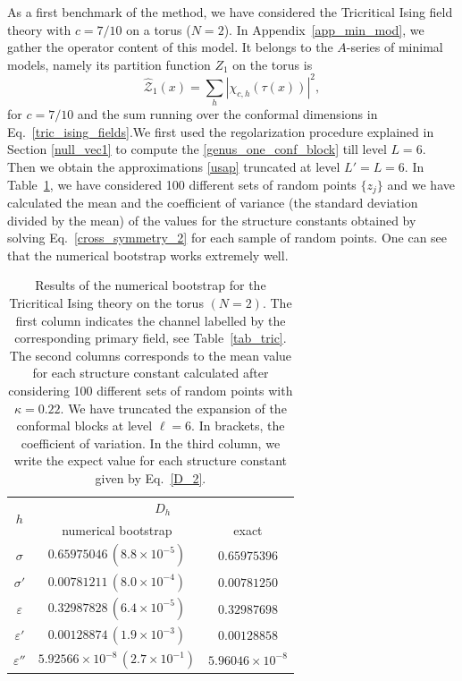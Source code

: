 \documentclass[a4paper,11pt]{article}
\begin{document}
As a first benchmark of the method, we have considered the Tricritical 
Ising field theory with $c=7/10$ on a torus ($N=2$). 
In Appendix~\ref{app_min_mod}, we gather the operator content
of this model. It belongs to the $A$-series of minimal models, namely  its partition function $Z_1$ on the torus is 
\begin{equation}
\hat{\mathcal{Z}}_1(x)=\sum_{h}|\chi_{c,h}(\tau(x))|^2,
\end{equation}
for $c=7/10$ and the sum running over the conformal dimensions in Eq.~\eqref{tric_ising_fields}.We first used the regolarization procedure explained in Section \ref{null_vec1} to compute the \eqref{genus_one_conf_block} till level $L=6$. Then we obtain the approximations \eqref{usap} 
truncated at level $L'=L=6$.
In Table~\ref{tab_tric_results}, we have considered 100 different sets of
random points $\{z_j\}$ and we have calculated the mean and 
the coefficient of  variance (the standard deviation divided by the mean) 
of the values for the structure constants obtained by solving Eq.~\eqref{cross_symmetry_2} 
for each sample of random points. One can see that the numerical  bootstrap works extremely well.

\begin{table}[tbp]
\centering
\begin{tabular}{|c|c|c|}
\hline 
  \multirow{2}{*}{$h$} &  \multicolumn{2}{c|}{$D_{h}$} \\
  \cline{2-3}
                       & numerical bootstrap  & exact  \\
 \hline
 $\sigma$        &  $0.65975046\,(8.8\times 10^{-5})$ & $0.65975396$\\
 $\sigma'$       &  $0.00781211\,(8.0\times 10^{-4})$ & $0.00781250$\\
 $\varepsilon$   &  $0.32987828\,(6.4\times 10^{-5})$ & $0.32987698$\\
 $\varepsilon'$  &  $0.00128874\,(1.9\times 10^{-3})$ & $0.00128858$\\
 $\varepsilon''$ &  $5.92566\times10^{-8}\,(2.7\times 10^{-1})$ & $5.96046\times 10^{-8}$ \\
 \hline
\end{tabular}
\caption{\label{tab_tric_results} Results of the numerical bootstrap for the Tricritical 
Ising theory on the torus $(N=2)$. The first column indicates the channel labelled by the
corresponding primary field, see Table~\ref{tab_tric}. The second columns corresponds to the mean value for 
each structure constant calculated after considering 100 different sets of random points with $\kappa=0.22$. 
We have truncated the expansion of the conformal blocks at level $\ell=6$. In brackets, the 
coefficient of variation. In the third column, we write the expect value for each structure constant given by Eq.~\eqref{D_2}.}
\end{table}
\end{document}
